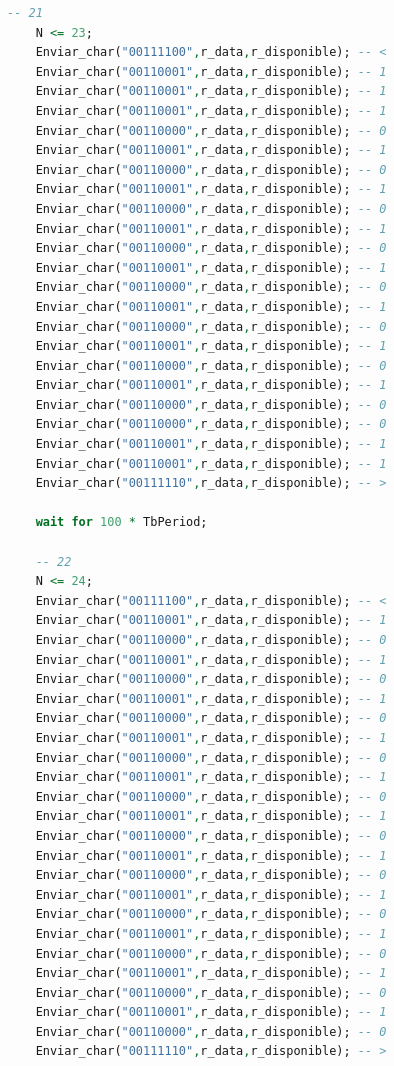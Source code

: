 \begin{lstlisting}[language = vhdl,caption=Testbench del módulo detector,label={lst:test_detector}]
	-- 21
	N <= 23; 	
	Enviar_char("00111100",r_data,r_disponible); -- < 	
	Enviar_char("00110001",r_data,r_disponible); -- 1 	
	Enviar_char("00110001",r_data,r_disponible); -- 1
 	Enviar_char("00110001",r_data,r_disponible); -- 1 	
	Enviar_char("00110000",r_data,r_disponible); -- 0
	Enviar_char("00110001",r_data,r_disponible); -- 1 	
	Enviar_char("00110000",r_data,r_disponible); -- 0
	Enviar_char("00110001",r_data,r_disponible); -- 1 	
	Enviar_char("00110000",r_data,r_disponible); -- 0
	Enviar_char("00110001",r_data,r_disponible); -- 1 	
	Enviar_char("00110000",r_data,r_disponible); -- 0
	Enviar_char("00110001",r_data,r_disponible); -- 1 	
	Enviar_char("00110000",r_data,r_disponible); -- 0
	Enviar_char("00110001",r_data,r_disponible); -- 1 	
	Enviar_char("00110000",r_data,r_disponible); -- 0
	Enviar_char("00110001",r_data,r_disponible); -- 1 	
	Enviar_char("00110000",r_data,r_disponible); -- 0
	Enviar_char("00110001",r_data,r_disponible); -- 1 	
	Enviar_char("00110000",r_data,r_disponible); -- 0
	Enviar_char("00110000",r_data,r_disponible); -- 0 	
	Enviar_char("00110001",r_data,r_disponible); -- 1
	Enviar_char("00110001",r_data,r_disponible); -- 1 	
	Enviar_char("00111110",r_data,r_disponible); -- >

	wait for 100 * TbPeriod;

	-- 22
	N <= 24; 	
	Enviar_char("00111100",r_data,r_disponible); -- < 	
	Enviar_char("00110001",r_data,r_disponible); -- 1 	
	Enviar_char("00110000",r_data,r_disponible); -- 0
 	Enviar_char("00110001",r_data,r_disponible); -- 1 	
	Enviar_char("00110000",r_data,r_disponible); -- 0
	Enviar_char("00110001",r_data,r_disponible); -- 1 	
	Enviar_char("00110000",r_data,r_disponible); -- 0
	Enviar_char("00110001",r_data,r_disponible); -- 1 	
	Enviar_char("00110000",r_data,r_disponible); -- 0
	Enviar_char("00110001",r_data,r_disponible); -- 1 	
	Enviar_char("00110000",r_data,r_disponible); -- 0
	Enviar_char("00110001",r_data,r_disponible); -- 1 	
	Enviar_char("00110000",r_data,r_disponible); -- 0
	Enviar_char("00110001",r_data,r_disponible); -- 1 	
	Enviar_char("00110000",r_data,r_disponible); -- 0
	Enviar_char("00110001",r_data,r_disponible); -- 1 	
	Enviar_char("00110000",r_data,r_disponible); -- 0
	Enviar_char("00110001",r_data,r_disponible); -- 1 	
	Enviar_char("00110000",r_data,r_disponible); -- 0
	Enviar_char("00110001",r_data,r_disponible); -- 1 	
	Enviar_char("00110000",r_data,r_disponible); -- 0
	Enviar_char("00110001",r_data,r_disponible); -- 1 
	Enviar_char("00110000",r_data,r_disponible); -- 0	
	Enviar_char("00111110",r_data,r_disponible); -- >
	

\end{lstlisting}
